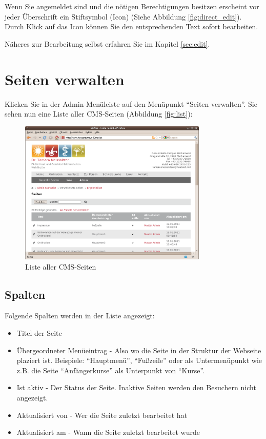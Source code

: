 \documentclass[article, a4paper, oneside, 11pt]{memoir}
\begin{document}
Wenn Sie angemeldet sind und die nötigen Berechtigungen besitzen erscheint vor jeder Überschrift ein Stiftsymbol (Icon) (Siehe Abbildung \vref{fig:direct_edit}). Durch Klick auf das Icon können Sie den entsprechenden Text sofort bearbeiten.

Näheres zur Bearbeitung selbst erfahren Sie im Kapitel \vref{sec:edit}.




\section{Seiten verwalten}

Klicken Sie in der Admin-Menüleiste auf den Menüpunkt "`Seiten verwalten"'. Sie sehen nun eine Liste aller CMS-Seiten (Abbildung \vref{fig:list}):

\begin{figure}[htp]
\centering
\includegraphics[width=0.8\textwidth]{list}
\caption{Liste aller CMS-Seiten}
\label{fig:list}
\end{figure}


\subsection{Spalten}

Folgende Spalten werden in der Liste angezeigt:

\begin{itemize}
\item Titel der Seite
\item Übergeordneter Menüeintrag - Also wo die Seite in der Struktur der Webseite plaziert ist. Beispiele: "`Hauptmenü"', "`Fußzeile"' oder als Untermenüpunkt wie z.B. die Seite "`Anfängerkurse"' als Unterpunkt von "`Kurse"'.
\item Ist aktiv - Der Status der Seite. Inaktive Seiten werden den Besuchern nicht angezeigt.
\item Aktualisiert von - Wer die Seite zuletzt bearbeitet hat
\item Aktualisiert am - Wann die Seite zuletzt bearbeitet wurde
\end{itemize}
\end{document}
